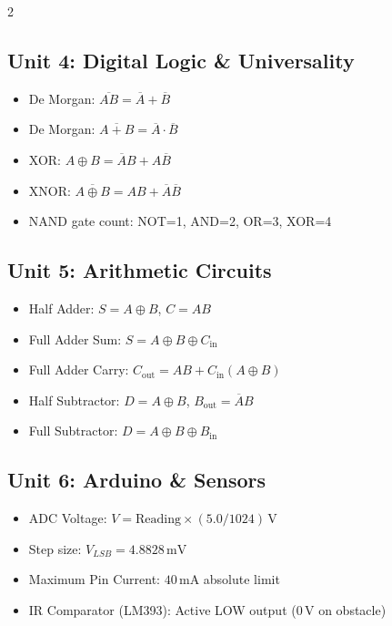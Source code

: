\begin{multicols}{2}
\subsection*{Unit 4: Digital Logic \& Universality}
\begin{itemize}
    \item De Morgan: $\overline{AB} = \overline{A} + \overline{B}$
    \item De Morgan: $\overline{A+B} = \overline{A} \cdot \overline{B}$
    \item XOR: $A \oplus B = \overline{A}B + A\overline{B}$
    \item XNOR: $\overline{A \oplus B} = AB + \overline{A}\overline{B}$
    \item NAND gate count: NOT=1, AND=2, OR=3, XOR=4
\end{itemize}

\subsection*{Unit 5: Arithmetic Circuits}
\begin{itemize}
    \item Half Adder: $S = A \oplus B$, $C = AB$
    \item Full Adder Sum: $S = A \oplus B \oplus C_{\mathrm{in}}$
    \item Full Adder Carry: $C_{\mathrm{out}} = AB + C_{\mathrm{in}}(A \oplus B)$
    \item Half Subtractor: $D = A \oplus B$, $B_{\mathrm{out}} = \overline{A}B$
    \item Full Subtractor: $D = A \oplus B \oplus B_{\mathrm{in}}$
\end{itemize}

\subsection*{Unit 6: Arduino \& Sensors}
\begin{itemize}
    \item ADC Voltage: $V = \text{Reading} \times (5.0 / 1024)\,\mathrm{V}$
    \item Step size: $V_{LSB} = 4.8828\,\mathrm{mV}$
    \item Maximum Pin Current: $40\,\mathrm{mA}$ absolute limit
    \item IR Comparator (LM393): Active LOW output ($0\,\mathrm{V}$ on obstacle)
\end{itemize}
\end{multicols}
\newpage
